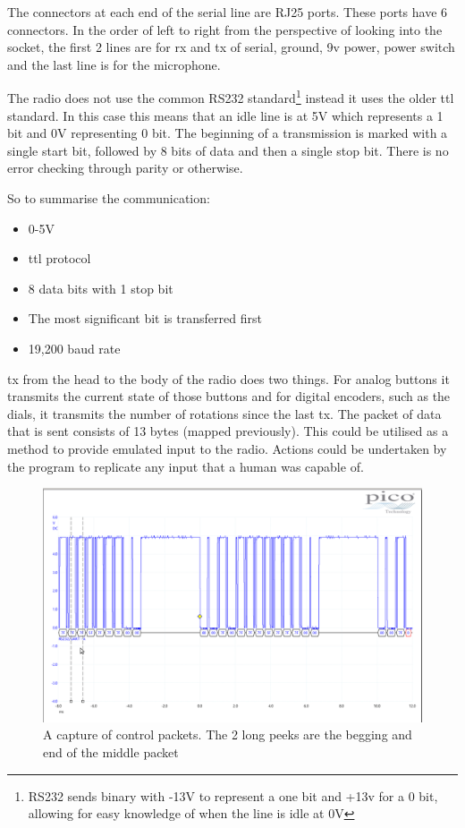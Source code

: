 The connectors at each end of the serial line are RJ25 ports. These ports have 6 connectors. In the order of left to right from the perspective of looking into the socket, the first 2 lines are for \gls{rx} and \gls{tx} of serial, ground, 9v power, power switch and the last line is for the microphone. 

The radio does not use the common RS232 standard\footnote{RS232 sends binary with -13V to represent a one bit and +13v for a 0 bit, allowing for easy knowledge of when the line is idle at 0V} instead it uses the older \gls{ttl} standard. In this case this means that an idle line is at 5V which represents a 1 bit and 0V representing 0 bit. The beginning of a transmission is marked with a single start bit, followed by 8 bits of data and then a single stop bit. There is no error checking through parity or otherwise. 

So to summarise the communication: 
\begin{itemize}
    \item 0-5V
    \item \gls{ttl} protocol
    \item 8 data bits with 1 stop bit
    \item The most significant bit is transferred first
    \item 19,200 baud rate
\end{itemize}

\gls{tx} from the head to the body of the radio does two things. For analog buttons it transmits the current state of those buttons and for digital encoders, such as the dials, it transmits the number of rotations since the last \gls{tx}. The packet of data that is sent consists of 13 bytes (mapped previously\cite{ben_report}). This could be utilised as a method to provide emulated input to the radio. Actions could be undertaken by the program to replicate any input that a human was capable of.

\begin{figure}
    \centering
    \includegraphics[width=1\textwidth]{img/controll_packet.png}
    \caption[Control packet]{A capture of control packets. The 2 long peeks are the begging and end of the middle packet}
    \label{fig:control_packet}
\end{figure}


